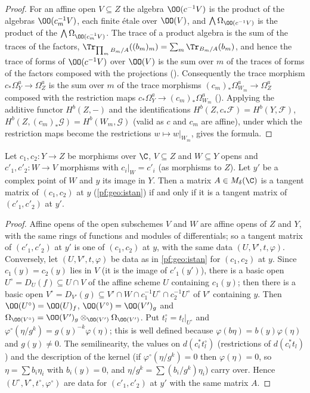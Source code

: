 \begin{proof}
For an affine open $V\subseteq Z$ the algebra $\OO(c^{-1}V)$ is the product of the algebras $\OO(c_m^{-1}V)$, each finite \'etale over
$\OO(V)$, and $\bigwedge\Omega_{\OO(c^{-1}V)}$ is the product of the $\bigwedge\Omega_{\OO(c_m^{-1}V)}$. The trace of a product algebra is the sum
of the traces of the factors, $\Tr_{\prod_mB_m/A}((b_m)_m)=\sum_m\Tr_{B_m/A}(b_m)$, and hence the trace of forms of $\OO(c^{-1}V)$ over $\OO(V)$
is the sum over $m$ of the traces of forms of the factors composed with the projections
(). Consequently the trace morphism $c_*\Omega^a_Y\to\Omega^a_Z$ is the sum over $m$ of the trace
morphisms $(c_m)_*\Omega^a_{W_m}\to\Omega^a_Z$ composed with the restriction maps $c_*\Omega^a_Y\to(c_m)_*\Omega^a_{W_m}$
(). Applying the additive functor $H^b(Z,-)$ and the identifications $H^b(Z,c_*\mathcal F)=H^b(Y,\mathcal F)$,
$H^b(Z,(c_m)_*\mathcal G)=H^b(W_m,\mathcal G)$ (valid as $c$ and $c_m$ are affine), under which the restriction maps become the restrictions
$w\mapsto w|_{W_m}$, gives the formula.
\end{proof}

\begin{lemma}\label{pf:hlf-cech:tanrestrict}
Let $c_1,c_2\colon Y\to Z$ be morphisms over $\C$, $V\subseteq Z$ and $W\subseteq Y$ opens and $c'_1,c'_2\colon W\to V$ morphisms with
$c_i|_W=c'_i$ (as morphisms to $Z$). Let $y'$ be a complex point of $W$ and $y$ its image in $Y$. Then a matrix $A\in M_\delta(\C)$ is a tangent
matrix of $(c_1,c_2)$ at $y$ (\cref{pf:geo:istan}) if and only if it is a tangent matrix of $(c'_1,c'_2)$ at $y'$.
\end{lemma}

\begin{proof}
Affine opens of the open subschemes $V$ and $W$ are affine opens of $Z$ and $Y$, with the same rings of functions and modules of
differentials; so a tangent matrix of $(c'_1,c'_2)$ at $y'$ is one of $(c_1,c_2)$ at $y$, with the same data $(U,V',t,\varphi)$.
Conversely, let $(U,V',t,\varphi)$ be data as in \cref{pf:geo:istan} for $(c_1,c_2)$ at $y$. Since $c_1(y)=c_2(y)$ lies in $V$ (it is the image
of $c'_1(y')$), there is a basic open $U^\circ=D_U(f)\subseteq U\cap V$ of the affine scheme $U$ containing $c_1(y)$; then there is a basic open
$V^\circ=D_{V'}(g)\subseteq V'\cap W\cap c_1^{-1}U^\circ\cap c_2^{-1}U^\circ$ of $V'$ containing $y$. Then $\OO(U^\circ)=\OO(U)_f$,
$\OO(V^\circ)=\OO(V')_g$ and $\Omega_{\OO(V^\circ)}=\OO(V')_g\otimes_{\OO(V')}\Omega_{\OO(V')}$. Put $t^\circ_l=t_l|_{U^\circ}$ and
$\varphi^\circ(\eta/g^k)=g(y)^{-k}\varphi(\eta)$; this is well defined because $\varphi(b\eta)=b(y)\varphi(\eta)$ and $g(y)\ne0$. The
semilinearity, the values on $d(c_i^*t^\circ_l)$ (restrictions of $d(c_i^*t_l)$) and the description of the kernel (if
$\varphi^\circ(\eta/g^k)=0$ then $\varphi(\eta)=0$, so $\eta=\sum b_i\eta_i$ with $b_i(y)=0$, and $\eta/g^k=\sum (b_i/g^k)\eta_i$) carry over.
Hence $(U^\circ,V^\circ,t^\circ,\varphi^\circ)$ are data for $(c'_1,c'_2)$ at $y'$ with the same matrix $A$.
\end{proof}

